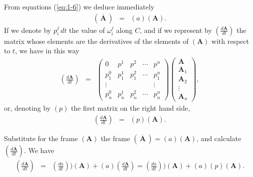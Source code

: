 From equations (\ref{eq:1-6}) we deduce immediately
\begin{eqnarray*}
(\, \overline{\bm A}\, ) &=& (a) (\bm A) .
\end{eqnarray*}
If we denote by $p^j_i\, dt$ the value of $\omega^j_i$ along $C$, and if we represent by $\left( \frac{d\bm A}{dt} \right)$ the matrix whose elements are the derivatives of the elements of $(\bm A)$ with respect to $t$, we have in this way
\begin{eqnarray*}
\left( \frac{d\bm A}{dt} \right) &=& 
\left(
\begin{array}{ccccc}
0 &  p^1  & p^2 & \cdots & p^n \\
p^0_1 &  p^1_1  & p^2_1  & \cdots & p^n_1 \\
\vdots &    &  & & \vdots \\
p^0_n &  p^1_n  & p^2_n  & \cdots & p^n_n 
\end{array}
\right)
\left(
\begin{array}{c}
\bm A \\  \bm A_1 \\\bm A_2 \\ \vdots \\ \bm A_n 
\end{array}
\right),
\end{eqnarray*}
or, denoting by $(p)$ the first matrix on the right hand side,
\begin{eqnarray*}
\left( \frac{d\bm A}{dt} \right) &=& (p) (\bm A) .
\end{eqnarray*}

Substitute for the frame $(\bm A)$ the frame $(\, \overline{\bm A}\, ) = (a) (\bm A)$, and calculate $\left( \frac{d\overline{\bm A}}{dt} \right)$. We have
\begin{eqnarray*}
\left( \frac{d\overline{\bm A}}{dt} \right) &=& \left(\frac{da}{dt} \right)) (\bm A) + (a) \left(\frac{d\bm A}{dt} \right) 
= \left(\frac{da}{dt} \right)) (\bm A) + (a) (p) \left(\bm A \right) .
\end{eqnarray*}

